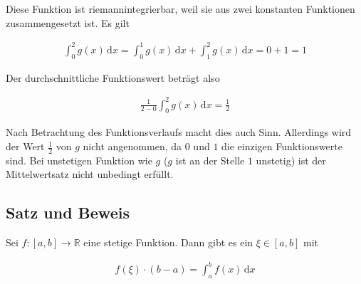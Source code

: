 \documentclass[fontsize=9pt,
               parskip=half-,
               DIV=14,
               listof=chapterentry,
               tocflat]{scrbook}
\begin{document}
Diese Funktion ist riemannintegrierbar, weil sie aus zwei konstanten Funktionen zusammengesetzt ist. Es gilt

\begin{align*}
\int _{0}^{2}g(x)\,\mathrm {d} x=\int _{0}^{1}g(x)\,\mathrm {d} x+\int _{1}^{2}g(x)\,\mathrm {d} x=0+1=1
\end{align*}

Der durchschnittliche Funktionswert beträgt also

\begin{align*}
{\frac {1}{2-0}}\int _{0}^{2}g(x)\,\mathrm {d} x={\frac {1}{2}}
\end{align*}

Nach Betrachtung des Funktionsverlaufs macht dies auch Sinn. Allerdings wird der Wert ${\tfrac {1}{2}}$ von $g$ nicht angenommen, da $0$ und $1$ die einzigen Funktionswerte sind. Bei unstetigen Funktion wie $g$ ($g$ ist an der Stelle $1$ unstetig) ist der Mittelwertsatz nicht unbedingt erfüllt.

\subsection{Satz und Beweis}

\begin{theorem*}
Sei $f:[a,b]\to \mathbb {R} $ eine stetige Funktion. Dann gibt es ein $\xi \in [a,b]$ mit

\begin{align*}
f(\xi )\cdot (b-a)=\int _{a}^{b}f(x)\,\mathrm {d} x
\end{align*}

\end{theorem*}
\end{document}
